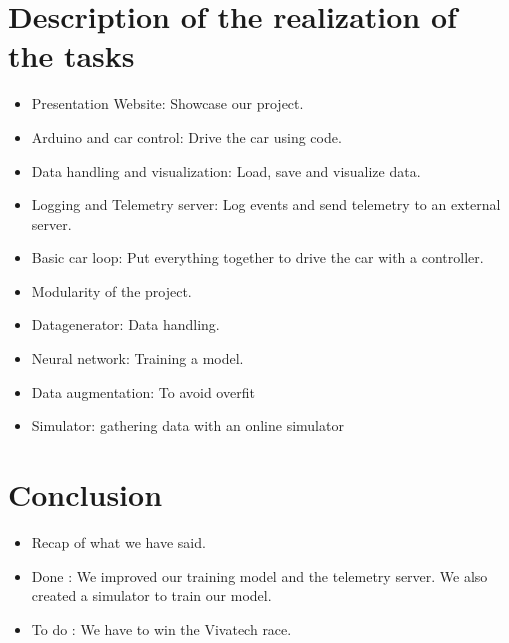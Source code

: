 \documentclass[11pt]{article}
\begin{document}
\section {Description of the realization of the tasks}

\begin{itemize}

\item Presentation Website: Showcase our project. %
\item Arduino and car control: Drive the car using code. %
\item Data handling and visualization: Load, save and visualize data. %
\item Logging and Telemetry server: Log events and send telemetry to an external server. %
\item Basic car loop: Put everything together to drive the car with a controller. %
\item Modularity of the project. %
\item Datagenerator: Data handling. %
\item Neural network: Training a model. %
\item Data augmentation: To avoid overfit %
\item Simulator: gathering data with an online simulator %

\end{itemize}

\section {Conclusion}

\begin{itemize}
\item Recap of what we have said.
\item Done : We improved our training model and the telemetry server. We also created a simulator to train our model. 

\item To do : We have to win the Vivatech race.

\end{itemize}
\end{document}
